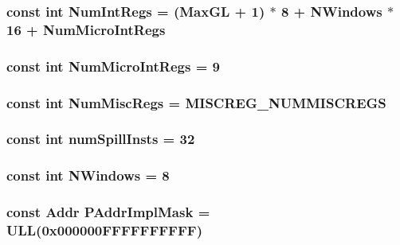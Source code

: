 \hypertarget{namespaceSparcISA_a9c412b5118ce369570c156c4e156638a}{
\subsubsection[{NumIntRegs}]{\setlength{\rightskip}{0pt plus 5cm}const int {\bf NumIntRegs} = ({\bf MaxGL} + 1) $\ast$ 8 + {\bf NWindows} $\ast$ 16 + {\bf NumMicroIntRegs}}}
\label{namespaceSparcISA_a9c412b5118ce369570c156c4e156638a}
\hypertarget{namespaceSparcISA_a985912475a96ec00a4ff48b39004d43a}{
\subsubsection[{NumMicroIntRegs}]{\setlength{\rightskip}{0pt plus 5cm}const int {\bf NumMicroIntRegs} = 9}}
\label{namespaceSparcISA_a985912475a96ec00a4ff48b39004d43a}
\hypertarget{namespaceSparcISA_a568d4aa96dd7cd963f3b1b1b0446c9c6}{
\subsubsection[{NumMiscRegs}]{\setlength{\rightskip}{0pt plus 5cm}const int {\bf NumMiscRegs} = MISCREG\_\-NUMMISCREGS}}
\label{namespaceSparcISA_a568d4aa96dd7cd963f3b1b1b0446c9c6}
\hypertarget{namespaceSparcISA_a2e68c763f4f92cca75cbbbad7d0ee75f}{
\subsubsection[{numSpillInsts}]{\setlength{\rightskip}{0pt plus 5cm}const int {\bf numSpillInsts} = 32}}
\label{namespaceSparcISA_a2e68c763f4f92cca75cbbbad7d0ee75f}
\hypertarget{namespaceSparcISA_a6216686abfee3750d491873b95a05308}{
\subsubsection[{NWindows}]{\setlength{\rightskip}{0pt plus 5cm}const int {\bf NWindows} = 8}}
\label{namespaceSparcISA_a6216686abfee3750d491873b95a05308}
\hypertarget{namespaceSparcISA_abb8b7685b079953e35015543262458e2}{
\subsubsection[{PAddrImplMask}]{\setlength{\rightskip}{0pt plus 5cm}const {\bf Addr} {\bf PAddrImplMask} = ULL(0x000000FFFFFFFFFF)}}
